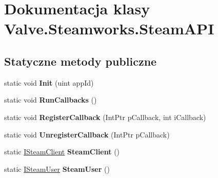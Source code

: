 \hypertarget{class_valve_1_1_steamworks_1_1_steam_a_p_i}{}\section{Dokumentacja klasy Valve.\+Steamworks.\+Steam\+A\+PI}
\label{class_valve_1_1_steamworks_1_1_steam_a_p_i}
\subsection*{Statyczne metody publiczne}
\begin{DoxyCompactItemize}
\item 
\mbox{\label{class_valve_1_1_steamworks_1_1_steam_a_p_i_ad8307c8bb32225555e9d040168756f09}} 
static void {\bfseries Init} (uint app\+Id)
\item 
\mbox{\label{class_valve_1_1_steamworks_1_1_steam_a_p_i_aea8f6af23cb0cd9b75d845c50482db0f}} 
static void {\bfseries Run\+Callbacks} ()
\item 
\mbox{\label{class_valve_1_1_steamworks_1_1_steam_a_p_i_a0eef45a91f5967a7b3526b118861a4fc}} 
static void {\bfseries Register\+Callback} (Int\+Ptr p\+Callback, int i\+Callback)
\item 
\mbox{\label{class_valve_1_1_steamworks_1_1_steam_a_p_i_a1b92b87ebcdb858c2c6f9ed4c7748cf5}} 
static void {\bfseries Unregister\+Callback} (Int\+Ptr p\+Callback)
\item 
\mbox{\label{class_valve_1_1_steamworks_1_1_steam_a_p_i_a24471f7d487f68c08762c26b82c38778}} 
static \hyperlink{class_valve_1_1_steamworks_1_1_i_steam_client}{I\+Steam\+Client} {\bfseries Steam\+Client} ()
\item 
\mbox{\label{class_valve_1_1_steamworks_1_1_steam_a_p_i_a0528500b31ab4d346daa222280cce34c}} 
static \hyperlink{class_valve_1_1_steamworks_1_1_i_steam_user}{I\+Steam\+User} {\bfseries Steam\+User} ()
\item 
\mbox{\label{class_valve_1_1_steamworks_1_1_steam_a_p_i_a60561d4e0eeb5df7292e3ef841ff7df7}} 

\end{DoxyCompactItemize}
